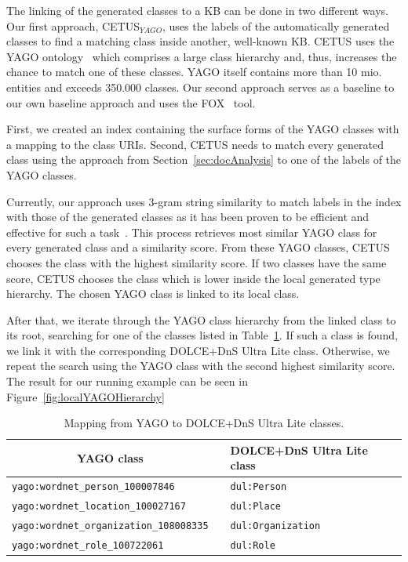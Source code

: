 The linking of the generated classes to a KB can be done in two different ways.
Our first approach, CETUS$_{YAGO}$,  uses the labels of the automatically generated classes to find a matching class inside another, well-known KB.
CETUS uses the YAGO ontology~\cite{mahdisoltani2014yago3} which comprises a large class hierarchy and, thus, increases the chance to match one of these classes.
YAGO itself contains more than 10 mio. entities and exceeds 350.000 classes.
Our second approach serves as a baseline to our own baseline approach and uses the FOX~\cite{FOX} tool.

First, we created an index containing the surface forms of the YAGO classes with a mapping to the class URIs.
Second, CETUS needs to match every generated class using the approach from Section~\ref{sec:docAnalysis} to one of the labels of the YAGO classes.

Currently, our approach uses 3-gram string similarity to match labels in the index with those of the generated classes as it has been proven to be efficient and effective for such a task~\cite{agdistis_iswc}.
This process retrieves most similar YAGO class for every generated class and a similarity score.
From these YAGO classes, CETUS chooses the class with the highest similarity score.
If two classes have the same score, CETUS chooses the class which is lower inside the local generated type hierarchy.
The chosen YAGO class is linked to its local class.

After that, we iterate through the YAGO class hierarchy from the linked class to its root, searching for one of the classes listed in Table~\ref{tab:yagoClassMatching}.
If such a class is found, we link it with the corresponding DOLCE+DnS Ultra Lite class.
Otherwise, we repeat the search using the YAGO class with the second highest similarity score.
The result for our running example can be seen in Figure~\ref{fig:localYAGOHierarchy}
\begin{table}
\centering
\begin{tabular}{lp{5mm}l}
\toprule
 \multicolumn{1}{c}{YAGO class} && DOLCE+DnS Ultra Lite class \\
\midrule
 \texttt{yago:wordnet\_person\_100007846} && \texttt{dul:Person} \\
 \texttt{yago:wordnet\_location\_100027167} && \texttt{dul:Place} \\
 \texttt{yago:wordnet\_organization\_108008335} && \texttt{dul:Organization} \\
 \texttt{yago:wordnet\_role\_100722061} && \texttt{dul:Role} \\
\bottomrule
\end{tabular}
\caption{Mapping from YAGO to DOLCE+DnS Ultra Lite classes.}
\label{tab:yagoClassMatching}
\end{table}


